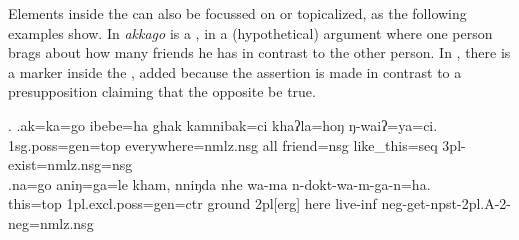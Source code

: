 Elements inside the  can also be focussed on or topicalized, as the following examples show. In \Next[a] \emph{akkago}  is a , in a (hypothetical) argument where one person brags about how many friends he has in contrast to the other person. In \Next[b], there is a  marker inside the , added because the assertion is made in contrast to a presupposition claiming that the opposite be true.
  
  \ex. \ag.ak=ka=go              ibebe=ha            ghak kamnibak=ci    khaʔla=hoŋ       ŋ-waiʔ=ya=ci.\\
  {\sc 1sg.poss=gen=top} everywhere{\sc =nmlz.nsg} all friend{\sc =nsg} like\_this{\sc =seq} {\sc 3pl-}exist{\sc [npst]=nmlz.nsg=nsg}\\
   
  \bg.na=go       aniŋ=ga=le                     kham, nniŋda  nhe  wa-ma      n-dokt-wa-m-ga-n=ha.\\
 this{\sc =top} {\sc 1pl.excl.poss=gen=ctr} ground {\sc 2pl[erg]} here live{\sc -inf} {\sc neg-}get{\sc-npst-2pl.A-2-neg=nmlz.nsg}\\
   
 

 
